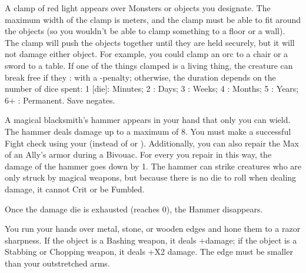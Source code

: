 {\LITURGY [
  Name= Clamp,
  Link= vulcan-liturgy-clamp,
  Paradigm= Force ,
  Save=  Y (negates) ,
  Duration= varies ,
  Counter=  n/a  ,
  Keywords= Contested ,
  Target=   Nearby object or Monster
]



A clamp of red light appears over \DICE Monsters or objects you designate. The maximum width of the clamp is \DICE meters, and the clamp must be able to fit around the objects (so you wouldn't be able to clamp something to a floor or a wall).  The clamp will push the objects together until they are held securely, but it will not damage either object.  For example, you could clamp an orc to a chair or a sword to a table.  If one of the things clamped is a living thing, the creature can break free if they \RB : \VIG with a -\DICE penalty; otherwise, the duration depends on the number of dice spent:  1 [die]: Minutes; 2 \DICE: Days; 3 \DICE: Weeks; 4 \DICE: Months; 5 \DICE: Years; 6+ \DICE: Permanent.  Save negates.

\LITURGY [
  Name= Hammer of the Forge,
  Link=vulcan-liturgy-hammer,
  Paradigm= Force ,
  Save=  N ,
  Duration= Session ,
  Counter=  n/a  ,
  Keywords= None ,
  Target=   Self
]



A magical blacksmith's hammer appears in your hand that only you can wield.  The hammer deals \DICE damage up to a maximum of 8. You must make a successful Fight check using your \FOC (instead of \VIG or \DEX).   Additionally, you can also repair the Max \UD of an Ally's armor during a Bivouac.  For every \DCUP you repair in this way, the damage of the hammer goes down by 1.  The hammer can strike creatures who are only struck by magical weapons, but because there is no die to roll when dealing damage, it cannot Crit or be Fumbled.  

Once the damage die is exhausted (reaches 0), the Hammer disappears.



\LITURGY [
  Name= Hone,
  Link=vulcan-liturgy-hone,
  Paradigm= Force ,
  Save=  0 ,
  Duration= Combat or \SUMDICE Minutes ,
  Counter=  n/a  ,
  Keywords= Splittable ,
  Target=   Close objects
]



You run your hands over \DICE metal, stone, or wooden edges and hone them to a razor sharpness. If the object is a Bashing weapon, it deals +\DICE damage; if the object is a Stabbing or Chopping weapon, it deals +\DICE X2 damage. The edge must be smaller than your outstretched arms.

}
